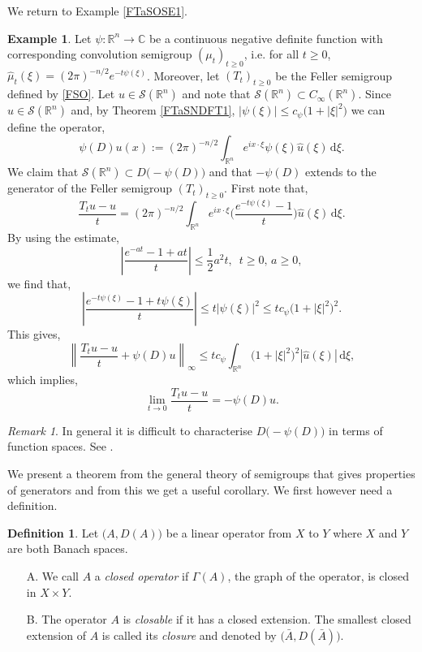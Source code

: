 \documentclass[a4paper, 12pt]{report}
\theoremstyle{remark}
\newtheorem{remark}[theorem]{Remark}
\theoremstyle{definition}
\newtheorem{definition}[theorem]{Definition}
\newtheorem{example}[theorem]{Example}
\begin{document}
We return to Example \ref{FTaSOSE1}.
\begin{example}\label{FTaSOSE2}
Let $\psi : \mathbb{R}^n \to \mathbb{C}$ be a continuous negative definite function with corresponding convolution semigroup $(\mu_t)_{t \ge 0}$, i.e. for all $t \ge 0$, $\hat{\mu}_t(\xi) = (2\pi)^{-n/2}e^{-t\psi(\xi)}$.  Moreover, let $(T_t)_{t \ge 0}$ be the Feller semigroup defined by \eqref{FSO}.  Let $u \in \mathcal{S}(\mathbb{R}^n)$ and note that $\mathcal{S}(\mathbb{R}^n) \subset C_\infty(\mathbb{R}^n)$.  Since $\hat{u} \in \mathcal{S}(\mathbb{R}^n)$ and, by Theorem \ref{FTaSNDFT1}, $|\psi(\xi)| \le c_\psi\big(1 + |\xi|^2\big)$ we can define the operator,
\begin{equation}\label{PDOwNDSeg}
\psi(D)u(x) := (2\pi)^{-n/2}\int_{\mathbb{R}^n}e^{ix\cdot\xi}\psi(\xi)\hat{u}(\xi)\,\mathrm{d}\xi.
\end{equation}
We claim that $\mathcal{S}(\mathbb{R}^n) \subset D\big(-\psi(D)\big)$ and that $-\psi(D)$ extends to the generator of the Feller semigroup $(T_t)_{t \ge 0}$.  First note that,
$$
\frac{T_tu - u}{t} = (2\pi)^{-n/2}\int_{\mathbb{R}^n}e^{ix\cdot\xi}\Big(\frac{e^{-t\psi(\xi)} - 1}{t}\Big)\hat{u}(\xi)\,\mathrm{d}\xi.
$$
By using the estimate,
$$
\left|\frac{e^{-at} - 1 + at}{t}\right| \le \frac{1}{2}a^2t, \,\,\, t \ge 0, \, a \ge 0,
$$
we find that,
$$
\left|\frac{e^{-t\psi(\xi)} - 1 + t\psi(\xi)}{t}\right| \le t|\psi(\xi)|^2 \le tc_\psi\big(1 + |\xi|^2\big)^2.
$$
This gives,
$$
\left\|\frac{T_tu - u}{t} + \psi(D)u\right\|_\infty \le tc_\psi\int_{\mathbb{R}^n}\big(1 + |\xi|^2\big)^2|\hat{u}(\xi)|\,\mathrm{d}\xi,
$$
which implies,
$$
\lim_{t \to 0}\frac{T_tu - u}{t} = -\psi(D)u.
$$
\end{example}
\begin{remark}
In general it is difficult to characterise $D\big(-\psi(D)\big)$ in terms of function spaces.  See \cite{Vol1}.
\end{remark}

We present a theorem from the general theory of semigroups that gives properties of generators and from this we get a useful corollary.  We first however need a definition.
\begin{definition}
Let $\big(A, D(A)\big)$ be a linear operator from $X$ to $Y$ where $X$ and $Y$ are both Banach spaces.
\begin{itemize}
\item[A.] We call $A$ a \emph{closed operator} if $\Gamma(A)$, the graph of the operator, is closed in $X \times Y$.

\item[B.] The operator $A$ is \emph{closable} if it has a closed extension.  The smallest closed extension of $A$ is called its \emph{closure} and denoted by $\big(\bar{A}, D(\bar{A})\big)$.
\end{itemize}
\end{definition}
\end{document}
